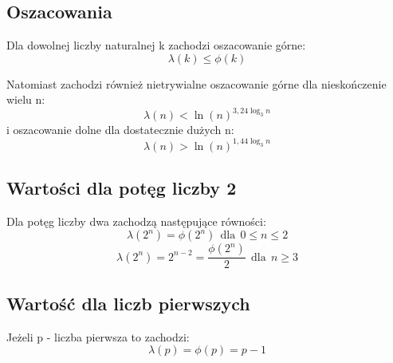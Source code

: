 \documentclass{article}
\begin{document}
\subsection*{Oszacowania}
Dla dowolnej liczby naturalnej k zachodzi oszacowanie górne:
$$ \lambda (k)\leq \phi (k) $$

Natomiast zachodzi również nietrywialne oszacowanie górne dla nieskończenie wielu n:
$$ \lambda (n)<\ln(n)^{3,24\log _{3}n} $$
i oszacowanie dolne dla dostatecznie dużych n:
$$ \lambda (n)>\ln(n)^{1,44\log _{3}n} $$

\subsection*{Wartości dla potęg liczby 2}
Dla potęg liczby dwa zachodzą następujące równości: 
\[ \lambda (2^{n})=\phi (2^{n}) ~~{\text{dla}}~~ 0\leq n\leq 2 \]
\[ \lambda (2^{n})=2^{n-2}={\frac {\phi (2^{n})}{2}} ~~{\text{dla}}~~ n\geq 3 \]

\subsection*{Wartość dla liczb pierwszych}
Jeżeli p - liczba pierwsza to zachodzi:
\begin{displaymath}
\lambda (p)=\phi (p)=p-1
\end{displaymath}
\end{document}
